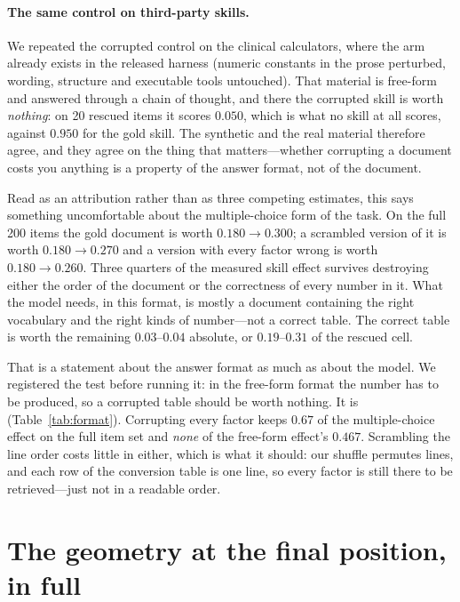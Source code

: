 \documentclass{article}
\begin{document}
\paragraph{The same control on third-party skills.} We repeated the corrupted
control on the clinical calculators, where the arm already exists in the
released harness (numeric constants in the prose perturbed, wording, structure
and executable tools untouched). That material is free-form and answered through
a chain of thought, and there the corrupted skill is worth \emph{nothing}: on 20
rescued items it scores $0.050$, which is what no skill at all scores, against
$0.950$ for the gold skill. The synthetic and the real material therefore agree,
and they agree on the thing that matters---whether corrupting a document costs
you anything is a property of the answer format, not of the document.

Read as an attribution rather than as three competing estimates, this says
something uncomfortable about the multiple-choice form of the task. On the full
200 items the gold document is worth $0.180 \to 0.300$; a scrambled version of
it is worth $0.180 \to 0.270$ and a version with every factor wrong is worth
$0.180 \to 0.260$. Three quarters of the measured skill effect survives
destroying either the order of the document or the correctness of every number
in it. What the model needs, in this format, is mostly a document containing the
right vocabulary and the right kinds of number---not a correct table. The
correct table is worth the remaining $0.03$--$0.04$ absolute, or $0.19$--$0.31$
of the rescued cell.

That is a statement about the answer format as much as about the model. We
registered the test before running it: in the free-form format the number has to
be produced, so a corrupted table should be worth nothing. It is
(Table~\ref{tab:format}). Corrupting every factor keeps $0.67$ of the
multiple-choice effect on the full item set and \emph{none} of the free-form
effect's $0.467$. Scrambling the line order costs little in either, which is what it
should: our shuffle permutes lines, and each row of the conversion table is one
line, so every factor is still there to be retrieved---just not in a readable
order.


\section{The geometry at the final position, in full}
\label{app:geometry}
\end{document}
